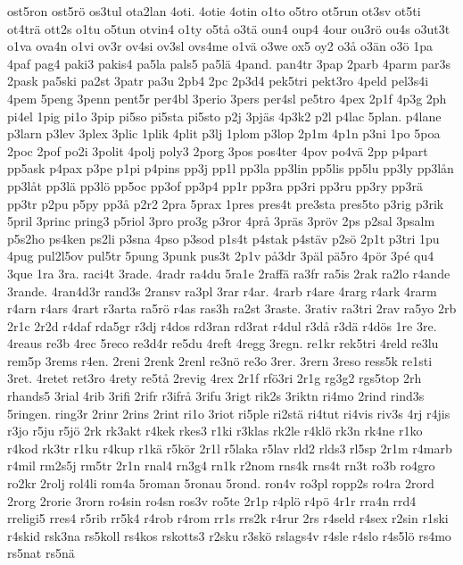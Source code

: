 {{ost5ron
ost5r^^f6
os3tul
ota2lan
4oti.
4otie
4otin
o1to
o5tro
ot5run
ot3sv
ot5ti
ot4tr^^e4
ott2s
o1tu
o5tun
otvin4
o1ty
o5t^^e5
o3t^^e4
oun4
oup4
4our
ou3r^^f6
ou4s
o3ut3t
o1va
ova4n
o1vi
ov3r
ov4si
ov3sl
ovs4me
o1v^^e4
o3we
ox5
oy2
o3^^e5
o3^^e4n
o3^^f6
1pa
4paf
pag4
paki3
pakis4
pa5la
pals5
pa5l^^e4
4pand.
pan4tr
3pap
2parb
4parm
par3s
2pask
pa5ski
pa2st
3patr
pa3u
2pb4
2pc
2p3d4
pek5tri
pekt3ro
4peld
pel3s4i
4pem
5peng
3penn
pent5r
per4bl
3perio
3pers
per4sl
pe5tro
4pex
2p1f
4p3g
2ph
pi4el
1pig
pi1o
3pip
pi5so
pi5sta
pi5sto
p2j
3pj^^e4s
4p3k2
p2l
p4lac
5plan.
p4lane
p3larn
p3lev
3plex
3plic
1plik
4plit
p3lj
1plom
p3lop
2p1m
4p1n
p3ni
1po
5poa
2poc
2pof
po2i
3polit
4polj
poly3
2porg
3pos
pos4ter
4pov
po4v^^e4
2pp
p4part
pp5ask
p4pax
p3pe
p1pi
p4pins
pp3j
pp1l
pp3la
pp3lin
pp5lis
pp5lu
pp3ly
pp3l^^e5n
pp3l^^e5t
pp3l^^e4
pp3l^^f6
pp5oc
pp3of
pp3p4
pp1r
pp3ra
pp3ri
pp3ru
pp3ry
pp3r^^e4
pp3tr
p2pu
p5py
pp3^^e5
p2r2
2pra
5prax
1pres
pres4t
pre3sta
pres5to
p3rig
p3rik
5pril
3princ
pring3
p5riol
3pro
pro3g
p3ror
4pr^^e5
3pr^^e4s
3pr^^f6v
2ps
p2sal
3psalm
p5s2ho
ps4ken
ps2li
p3sna
4pso
p3sod
p1s4t
p4stak
p4st^^e4v
p2s^^f6
2p1t
p3tri
1pu
4pug
pul2l5ov
pul5tr
5pung
3punk
pus3t
2p1v
p^^e53dr
3p^^e4l
p^^e45ro
4p^^f6r
3p^^e9
qu4
3que
1ra
3ra.
raci4t
3rade.
4radr
ra4du
5ra1e
2raff^^e4
ra3fr
ra5is
2rak
ra2lo
r4ande
3rande.
4ran4d3r
rand3s
2ransv
ra3pl
3rar
r4ar.
4rarb
r4are
4rarg
r4ark
4rarm
r4arn
r4ars
4rart
r3arta
ra5r^^f6
r4as
ras3h
ra2st
3raste.
3rativ
ra3tri
2rav
ra5yo
2rb
2r1c
2r2d
r4daf
rda5gr
r3dj
r4dos
rd3ran
rd3rat
r4dul
r3d^^e5
r3d^^e4
r4d^^f6s
1re
3re.
4reaus
re3b
4rec
5reco
re3d4r
re5du
4reft
4regg
3regn.
re1kr
rek5tri
4reld
re3lu
rem5p
3rems
r4en.
2reni
2renk
2renl
re3n^^f6
re3o
3rer.
3rern
3reso
ress5k
re1sti
3ret.
4retet
ret3ro
4rety
re5t^^e5
2revig
4rex
2r1f
rf^^f63ri
2r1g
rg3g2
rgs5top
2rh
rhands5
3rial
4rib
3rifi
2rifr
r3ifr^^e5
3rifu
3rigt
rik2s
3riktn
ri4mo
2rind
rind3s
5ringen.
ring3r
2rinr
2rins
2rint
ri1o
3riot
ri5ple
ri2st^^e4
ri4tut
ri4vis
riv3s
4rj
r4jis
r3jo
r5ju
r5j^^f6
2rk
rk3akt
r4kek
rkes3
r1ki
r3klas
rk2le
r4kl^^f6
rk3n
rk4ne
r1ko
r4kod
rk3tr
r1ku
r4kup
r1k^^e4
r5k^^f6r
2r1l
r5laka
r5lav
rld2
rlds3
rl5sp
2r1m
r4marb
r4mil
rm2s5j
rm5tr
2r1n
rnal4
rn3g4
rn1k
r2nom
rns4k
rns4t
rn3t
ro3b
ro4gro
ro2kr
2rolj
rol4li
rom4a
5roman
5ronau
5rond.
ron4v
ro3pl
ropp2s
ro4ra
2rord
2rorg
2rorie
3rorn
ro4sin
ro4sn
ros3v
ro5te
2r1p
r4pl^^f6
r4p^^f6
4r1r
rra4n
rrd4
rreligi5
rres4
r5rib
rr5k4
r4rob
r4rom
rr1s
rrs2k
r4rur
2rs
r4seld
r4sex
r2sin
r1ski
r4skid
rsk3na
rs5koll
rs4kos
rskotts3
r2sku
r3sk^^f6
rslags4v
r4sle
r4slo
r4s5l^^f6
rs4mo
rs5nat
rs5n^^e4
}}
